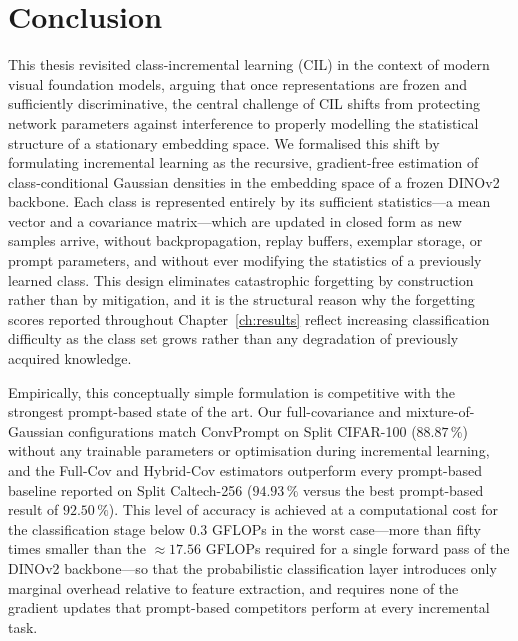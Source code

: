 \chapter{Conclusion}
\label{ch:conclusion}

This thesis revisited class-incremental learning (CIL) in the context of modern visual foundation models, arguing that once representations are frozen and sufficiently discriminative, the central challenge of CIL shifts from protecting network parameters against interference to properly modelling the statistical structure of a stationary embedding space. We formalised this shift by formulating incremental learning as the recursive, gradient-free estimation of class-conditional Gaussian densities in the embedding space of a frozen DINOv2 backbone. Each class is represented entirely by its sufficient statistics---a mean vector and a covariance matrix---which are updated in closed form as new samples arrive, without backpropagation, replay buffers, exemplar storage, or prompt parameters, and without ever modifying the statistics of a previously learned class. This design eliminates catastrophic forgetting by construction rather than by mitigation, and it is the structural reason why the forgetting scores reported throughout Chapter~\ref{ch:results} reflect increasing classification difficulty as the class set grows rather than any degradation of previously acquired knowledge.

Empirically, this conceptually simple formulation is competitive with the strongest prompt-based state of the art. Our full-covariance and mixture-of-Gaussian configurations match ConvPrompt on Split CIFAR-100 ($88.87\,\%$) without any trainable parameters or optimisation during incremental learning, and the Full-Cov and Hybrid-Cov estimators outperform every prompt-based baseline reported on Split Caltech-256 ($94.93\,\%$ versus the best prompt-based result of $92.50\,\%$). This level of accuracy is achieved at a computational cost for the classification stage below $0.3$ GFLOPs in the worst case---more than fifty times smaller than the $\approx 17.56$ GFLOPs required for a single forward pass of the DINOv2 backbone---so that the probabilistic classification layer introduces only marginal overhead relative to feature extraction, and requires none of the gradient updates that prompt-based competitors perform at every incremental task.

